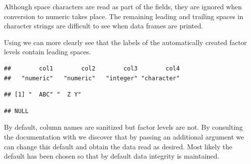 \documentclass[krantz2]{krantz}\usepackage{knitr}
\begin{document}
Although space characters are read as part of the fields, they are ignored when conversion to numeric takes place. The remaining leading and trailing spaces in character strings are difficult to see when data frames are printed.
\begin{knitrout}\footnotesize
{}\color{fgcolor}\begin{kframe}
\begin{alltt}
 \hlkwb{<-} \hlstd{(}\hlstd{)}
\end{alltt}
\end{kframe}
\end{knitrout}

Using  we can more clearly see that the labels of the automatically created factor levels contain leading spaces.
\begin{knitrout}\footnotesize
{}\color{fgcolor}\begin{kframe}
\begin{alltt}
\end{alltt}
\begin{verbatim}
##        col1        col2        col3        col4 
##   "numeric"   "numeric"   "integer" "character"
\end{verbatim}
\begin{alltt}
\hlstd{from_csv_b.df[[}\hlstd{]]}
\end{alltt}
\begin{verbatim}
## [1] "  ABC" "  Z Y"
\end{verbatim}
\begin{alltt}
\hlstd{(from_csv_b.df[[}\hlstd{]])}
\end{alltt}
\begin{verbatim}
## NULL
\end{verbatim}
\end{kframe}
\end{knitrout}

By default, column names are sanitized but factor levels are not. By consulting the documentation with  we discover that by passing an additional argument we can change this default and obtain the data read as desired. Most likely the default has been chosen so that by default data integrity is maintained.
\end{document}
